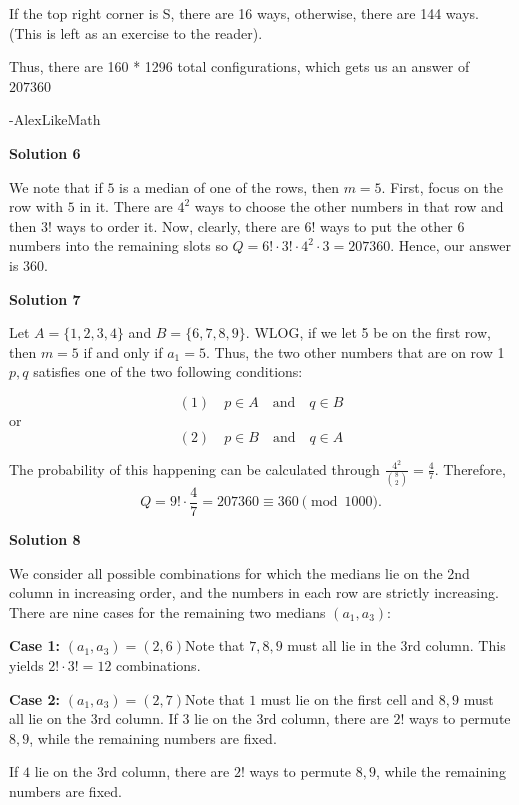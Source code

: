\begin{enumerate}
 If the top right corner is S, there are 16 ways, otherwise, there are 144 ways. (This is left as an exercise to the reader).

 Thus, there are 160 * 1296 total configurations, which gets us an answer of $207\boxed{360}$

 -AlexLikeMath

 



\textbf{Solution 6}

We note that if $5$ is a median of one of the rows, then $m=5$. First, focus on the row with $5$ in it. There are $4^2$ ways to choose the other numbers in that row and then $3!$ ways to order it. Now, clearly, there are $6!$ ways to put the other $6$ numbers into the remaining slots so $Q=6!\cdot3!\cdot4^2\cdot3=207360$. Hence, our answer is $\boxed{360}$.

 



\textbf{Solution 7}

Let $A = \{1,2,3,4\}$ and $B = \{6,7,8,9\}$. WLOG, if we let 5 be on the first row, then $m=5$ if and only if $a_1=5$. Thus, the two other numbers that are on row 1 $p, q$ satisfies one of the two following conditions:

 
 \[(1) \quad p\in A \quad \textrm{and} \quad q\in B\]or
 \[(2) \quad p\in B \quad \textrm{and} \quad q\in A\]

 The probability of this happening can be calculated through $\frac{4^2}{{8 \choose 2}} = \frac{4}{7}$. Therefore, 
 \[Q = 9! \cdot \frac{4}{7} = 207360 \equiv \boxed{360} \pmod {1000} .\]




\textbf{Solution  8}

We consider all possible combinations for which the medians lie on the 2nd column in increasing order, and the numbers in each row are strictly increasing. There are nine cases for the remaining two medians $(a_1,a_3)$:

 \textbf{Case 1: }$(a_1,a_3)=(2,6)$Note that $7,8,9$ must all lie in the 3rd column. This yields $2!\cdot 3!=12$ combinations.

 \textbf{Case 2: }$(a_1,a_3)=(2,7)$Note that $1$ must lie on the first cell and $8,9$ must all lie on the 3rd column. If $3$ lie on the 3rd column, there are $2!$ ways to permute $8,9$, while the remaining numbers are fixed.

 If $4$ lie on the 3rd column, there are $2!$ ways to permute $8,9$, while the remaining numbers are fixed.


\end{enumerate}
